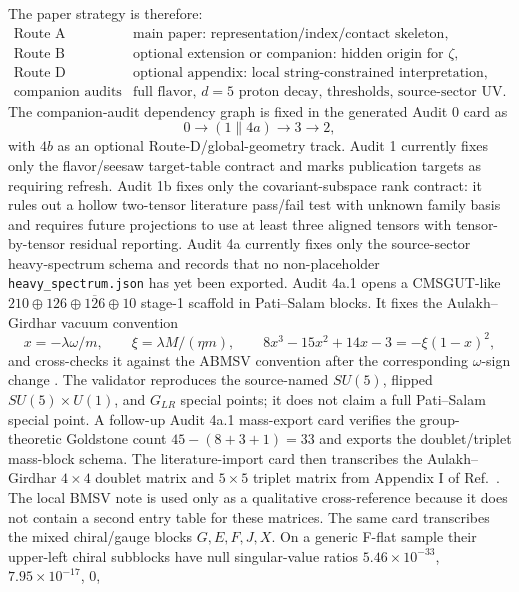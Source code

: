 \documentclass[
  aps,
  prd,
  preprint,
  nofootinbib,
  superscriptaddress,
  longbibliography
]{revtex4-2}
\begin{document}
The paper strategy is therefore:
\[
\begin{array}{ll}
\text{Route A} &
\text{main paper: representation/index/contact skeleton},\\
\text{Route B} &
\text{optional extension or companion: hidden origin for }\zeta,\\
\text{Route D} &
\text{optional appendix: local string-constrained interpretation},\\
\text{companion audits} &
\text{full flavor, }d=5\text{ proton decay, thresholds, source-sector UV}.
\end{array}
\]
The companion-audit dependency graph is fixed in the generated Audit 0 card as
\[
  0 \longrightarrow (1\parallel 4a)\longrightarrow 3\longrightarrow 2,
\]
with \(4b\) as an optional Route-D/global-geometry track.  Audit 1 currently
fixes only the flavor/seesaw target-table contract and marks publication
targets as requiring refresh.  Audit 1b fixes only the covariant-subspace
rank contract: it rules out a hollow two-tensor literature pass/fail test with
unknown family basis and requires future projections to use at least three
aligned tensors with tensor-by-tensor residual reporting.  Audit 4a currently
fixes only the source-sector heavy-spectrum schema and records that no
non-placeholder \texttt{heavy\_spectrum.json} has yet been exported.  Audit
4a.1 opens a CMSGUT-like \(210\oplus126\oplus\overline{126}\oplus10\)
stage-1 scaffold in Pati--Salam blocks.  It fixes the Aulakh--Girdhar vacuum
convention
\[
  x=-\lambda\omega/m,\qquad
  \xi=\lambda M/(\eta m),\qquad
  8x^3-15x^2+14x-3=-\xi(1-x)^2,
\]
and cross-checks it against the ABMSV convention after the corresponding
\(\omega\)-sign change \cite{AulakhGirdhar2005,AulakhBajcMelfoSenjanovicVissani2004}.
The validator reproduces the source-named \(SU(5)\), flipped
\(SU(5)\times U(1)\), and \(G_{LR}\) special points; it does not claim a full
Pati--Salam special point.  A follow-up Audit 4a.1 mass-export card verifies
the group-theoretic Goldstone count \(45-(8+3+1)=33\) and exports the
doublet/triplet mass-block schema.  The literature-import card then
transcribes the Aulakh--Girdhar \(4\times4\) doublet matrix and \(5\times5\)
triplet matrix from Appendix I of Ref.~\cite{AulakhGirdhar2005}.  The local
BMSV note is used only as a qualitative cross-reference because it does not
contain a second entry table for these matrices.  The same card transcribes
the mixed chiral/gauge blocks \(G,E,F,J,X\).  On a generic F-flat sample their
upper-left chiral subblocks have null singular-value ratios
\(5.46\times10^{-33}\), \(7.95\times10^{-17}\), \(0\),
\end{document}
